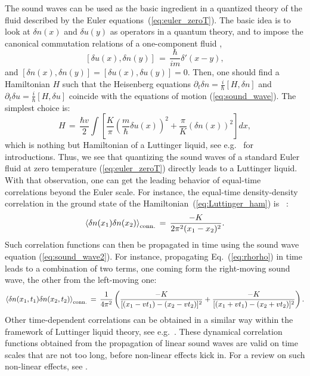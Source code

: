 \documentclass[onecolumn,amsfonts,showpacs,superscriptaddress]{revtex4-1}
\begin{document}
The sound waves can be used as the basic ingredient in a quantized theory of the fluid described by the Euler equations~(\ref{eq:euler_zeroT}). The basic idea is to look at $\delta n(x)$ and $\delta u(y)$ as operators in a quantum theory, and to impose the canonical commutation relations of a one-component fluid \citep{landau1941theory},
\begin{equation}
    \label{eq:landau_canonical}
    \left[ \delta u (x) , \delta n(y) \right] \, = \,  \frac{\hbar}{i m} \delta'(x-y) ,
\end{equation}
and $\left[ \delta n (x) , \delta n(y) \right] = \left[ \delta u (x) , \delta u(y) \right] = 0$. Then, one should find a Hamiltonian $H$ such that the Heisenberg equations $\partial_t \delta n = \frac{i}{\hbar} [H, \delta n]$ and $\partial_t \delta u = \frac{i}{\hbar} [H, \delta u]$ coincide with the equations of motion (\ref{eq:sound_wave}). The simplest choice is:
\begin{equation}
    \label{eq:Luttinger_ham}
    H \, = \, \frac{\hbar v}{2} \int \left[ \frac{K}{\pi} \left( \frac{m}{\hbar} \delta u(x) \right)^2 + \frac{\pi}{K} (\delta n(x))^2 \right] dx ,
\end{equation}
which is nothing but Hamiltonian of a Luttinger liquid, see e.g.~\citep{giamarchi2003quantum,cazalilla2004bosonizing,tsvelik2007quantum} for  introductions. Thus, we see that quantizing the sound waves of a standard Euler fluid at zero temperature (\ref{eq:euler_zeroT}) directly leads to a Luttinger liquid. With that observation, one can get the leading behavior of equal-time correlations beyond the Euler scale. For instance, the equal-time density-density correlation in the ground state of the Hamiltonian~(\ref{eq:Luttinger_ham}) is ~\citep{giamarchi2003quantum,cazalilla2004bosonizing,tsvelik2007quantum}:
\begin{equation}
    \label{eq:rhorho}
    \left< \delta n(x_1) \delta n(x_2) \right>_{\rm conn.} \, = \, \frac{-K}{2 \pi^2 (x_1-x_2)^2} .
\end{equation}
Such correlation functions can then be propagated in time using the sound wave equation (\ref{eq:sound_wave2}). For instance, propagating Eq.~(\ref{eq:rhorho}) in time leads to a combination of two terms, one coming form the right-moving sound wave, the other from the left-moving one:
\begin{equation}
    \left< \delta n(x_1,t_1) \delta n(x_2,t_2) \right>_{\rm conn.} \, = \, \frac{1}{4 \pi^2} \left( \frac{-K}{[(x_1 -v t_1) - (x_2 - v t_2) ]^2} + \frac{-K}{[(x_1 + v t_1) - (x_2+ v t_2) ]^2} \right).
\end{equation}
Other time-dependent correlations can be obtained in a similar way within the framework of Luttinger liquid theory, see e.g.~\citep{giamarchi2003quantum,cazalilla2004bosonizing,tsvelik2007quantum}. These dynamical correlation functions obtained from the propagation of linear sound waves are valid on time scales that are not too long, before non-linear effects kick in. For a review on such non-linear effects, see \citep{imambekov2012one}.
\end{document}
